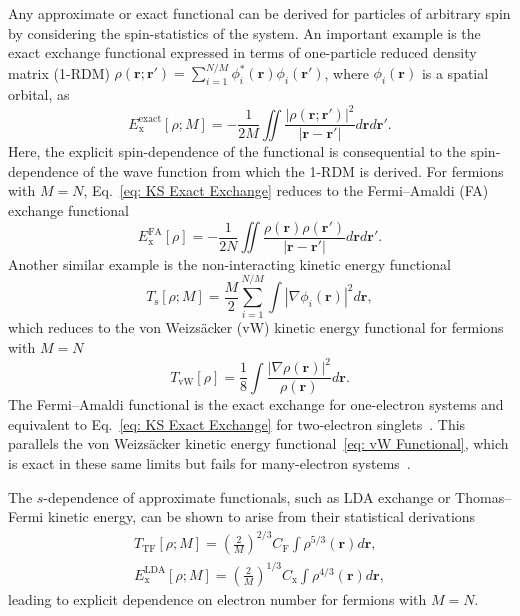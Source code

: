 \documentclass[%
 reprint,
 amsmath,amssymb,
 aps,
pra,
]{revtex4-2}
\begin{document}
Any approximate or exact functional can be derived for particles of arbitrary spin by considering the spin-statistics of the system. An important example is the exact exchange functional expressed in terms of one-particle reduced density matrix (1-RDM) $\rho(\mathbf{r};\mathbf{r}') = \sum_{i=1}^{N/M} \phi_i^*(\mathbf{r}) \phi_i(\mathbf{r}')$, where $\phi_i(\mathbf{r})$ is a spatial orbital, as
\begin{equation}
    E_{\text{x}}^{\text{exact}}
    [\rho; M]
    =
    -\frac{1}{2M}
    \iint
    \frac{|\rho(\mathbf{r};\mathbf{r}')|^2}
    {|\mathbf{r}-\mathbf{r}'|}
    d\mathbf{r}d\mathbf{r}'.
    \label{eq: KS Exact Exchange}
\end{equation}
Here, the explicit spin-dependence of the functional is consequential to the spin-dependence of the wave function from which the 1-RDM is derived. For fermions with $M=N$, Eq.~\eqref{eq: KS Exact Exchange} reduces to the Fermi--Amaldi (FA) exchange functional~\cite{Fermi.1934.MRAI.6.117}
\begin{equation}
    E_{\text{x}}^{\text{FA}}
    [\rho]
    =
    -\frac{1}{2N}
    \iint
    \frac{\rho(\mathbf{r})\rho(\mathbf{r}')}{|\mathbf{r}-\mathbf{r}'|}
    d\mathbf{r}d\mathbf{r}'.
    \label{eq: FA Functional}
\end{equation}
Another similar example is the non-interacting kinetic energy functional 
\begin{equation}
    T_{\text{s}}[\rho; M]
    =
    \frac{M}{2}
    \sum^{N/M}_{i=1}
    \int
    |\nabla \phi_i(\mathbf{r})|^2
    d\mathbf{r},
\end{equation}
which reduces to the von Weizsäcker (vW) kinetic energy functional for fermions with $M=N$~\cite{Weizsäcker.1935.ZP.96.431,Parr.1989.density}
\begin{equation}
    T_{\text{vW}}[\rho]
    =
    \frac{1}{8}
    \int
    \frac{|\nabla \rho(\mathbf{r})|^2}{\rho(\mathbf{r})}
    d\mathbf{r}.\label{eq: vW Functional}
\end{equation}
The Fermi--Amaldi functional is the exact exchange for one-electron systems and equivalent to Eq.~\eqref{eq: KS Exact Exchange} for two-electron singlets~\cite{Ayers.2005.MP.103.2061, Bosko.2023.JCP.159.131101}. This parallels the von Weizsäcker kinetic energy functional~\eqref{eq: vW Functional}, which is exact in these same limits but fails for many-electron systems~\cite{Weizsäcker.1935.ZP.96.431, Parr.1989.density}. 

The $s$-dependence of approximate functionals, such as LDA exchange or Thomas--Fermi kinetic energy, can be shown to arise from their statistical derivations~\cite{Parr.1989.density, Bosko.2023.PRA.108.052803}
\begin{gather}
    T_{\text{TF}}[\rho; M]
    =
    \left(\frac{2}{M}\right)^{2/3}
    C_{\text{F}}
    \int
    \rho^{5/3}(\mathbf{r})
    d\mathbf{r},\\[10pt]
    E_{\text{x}}^{\text{LDA}}[\rho; M]
    =
    \left(
    \frac{2}{M}
    \right)^{1/3}
    C_{\text{x}}
    \int
    \rho^{4/3}(\mathbf{r})
    d\mathbf{r},
\end{gather}
leading to explicit dependence on electron number for fermions with $M=N$.
\end{document}
